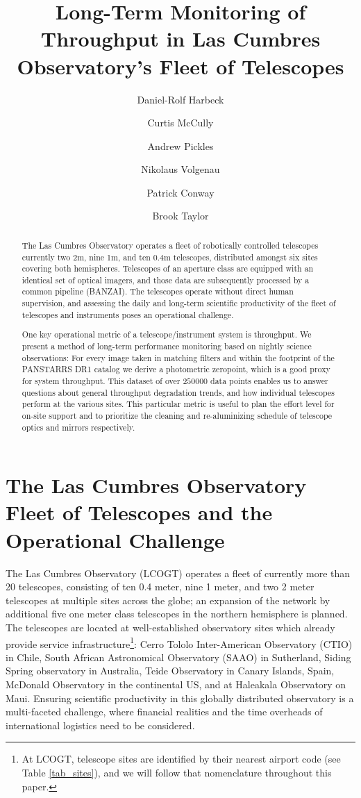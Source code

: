 \documentclass[]{spieman}
\title{Long-Term Monitoring of Throughput in Las Cumbres Observatory's Fleet of Telescopes}
\author[a]{Daniel-Rolf Harbeck}
\author[a]{Curtis McCully}
\author[a]{Andrew Pickles}
\author[a]{Nikolaus Volgenau}
\author[a]{Patrick Conway}
\author[a]{Brook Taylor}
\affil[a] {Las Cumbres Observatory, Goleta, CA (USA)}
\begin{document}
\maketitle

\begin{abstract}
The Las Cumbres Observatory operates a fleet of robotically controlled telescopes currently two 2m,
nine 1m, and ten 0.4m telescopes, distributed amongst six sites covering both hemispheres.
Telescopes of an aperture class are equipped with an identical set of optical imagers, and those
data are subsequently processed by a common pipeline (BANZAI). The telescopes operate without direct
human supervision, and assessing the daily and long-term scientific productivity of the fleet of
telescopes and instruments poses an operational challenge.

One key operational metric of a telescope/instrument system is throughput. We present a method of
long-term performance monitoring based on nightly science observations: For every image taken in
matching filters and within the footprint of the PANSTARRS DR1 catalog we derive a photometric
zeropoint, which is a good proxy for system throughput. This dataset of over $250000$ data points
enables us to answer questions about general throughput degradation trends, and how individual
telescopes perform at the various sites. This particular metric is useful to plan the effort level
for on-site support and to prioritize the cleaning and re-aluminizing schedule of telescope optics
and mirrors respectively.
\end{abstract}




\section{The Las Cumbres Observatory Fleet of Telescopes and the Operational Challenge}

The Las Cumbres Observatory (LCOGT) operates a fleet of currently more than 20 telescopes,
consisting of ten 0.4 meter, nine 1 meter, and two 2 meter telescopes at multiple sites across the
globe\cite{brown2013}; an expansion of the network by additional five one meter class telescopes in
the northern hemisphere is planned. The telescopes are located at well-established observatory sites
which already provide service infrastructure\footnote{At LCOGT, telescope sites are identified by
    their nearest airport code (see Table \ref{tab_sites}), and we will follow that nomenclature    
    throughout this paper.}: Cerro Tololo Inter-American Observatory (CTIO) in Chile, South 
    African
Astronomical Observatory (SAAO) in Sutherland, Siding Spring observatory in Australia, Teide
Observatory in Canary Islands, Spain, McDonald Observatory in the continental US, and at Haleakala
Observatory on
Maui. Ensuring scientific productivity in this globally distributed observatory is a multi-faceted
challenge, where financial realities and the time overheads of international logistics need to be
considered.
\end{document}
